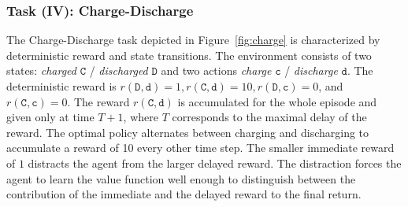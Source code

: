\documentclass{article}
\begin{document}
\begin{appendices}
\begin{landscape}
\begin{table}[htp]
\begin{center}
\end{center}
\end{table}
\end{landscape}












\subsubsection{Task (IV): Charge-Discharge}
\label{sec:Acharge_discharge}
The Charge-Discharge task depicted in Figure~\ref{fig:charge}
is characterized by
deterministic reward and state transitions.
The environment consists of two states: 
{\em charged} $\mathtt{C}$ / {\em discharged} $\mathtt{D}$ 
and two actions {\em charge} $\mathtt{c}$ / {\em discharge}
$\mathtt{d}$.
The deterministic reward is $r(\mathtt{D},\mathtt{d})=1, r(\mathtt{C},\mathtt{d})=10,
r(\mathtt{D},\mathtt{c})=0$,
and $r(\mathtt{C},\mathtt{c})=0$. 
The reward $r(\mathtt{C},\mathtt{d})$ is accumulated 
for the whole episode and given only at time $T+1$,
where $T$ corresponds to the maximal delay of the reward.
The optimal policy alternates between charging and discharging
to accumulate a reward of 10 every other time step. 
The smaller immediate reward of $1$ distracts the agent from 
the larger delayed reward. The distraction forces the agent to learn 
the value function well enough to distinguish between the contribution of the 
immediate and the delayed reward to the final return.  
\begin{figure}[htp]\centering {}
\end{figure}
\end{appendices}
\end{document}
